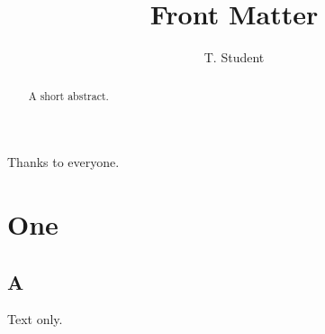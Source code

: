 \documentclass[phd,strict,12pt,a4paper]{bangorthesis}
\title{Front Matter}
\author{T. Student}
\begin{document}
\maketitle
\begin{acknowledgements}
  Thanks to everyone.
\end{acknowledgements}
\begin{abstract}
  A short abstract.
\end{abstract}
\tables
\printabbrevs
\chapter{One}
\section{A}
Text only.
\end{document}
